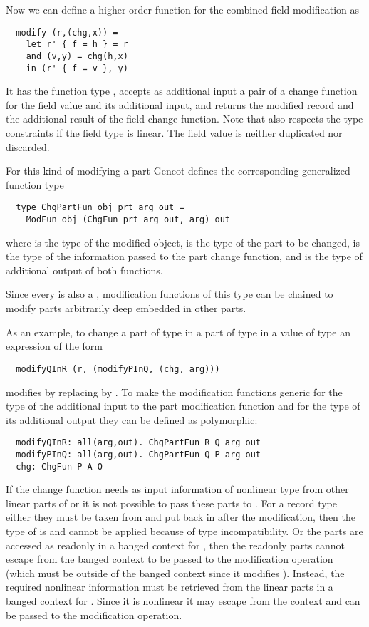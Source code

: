 Now we can define a higher order function for the combined field modification as
\begin{verbatim}
  modify (r,(chg,x)) = 
    let r' { f = h } = r
    and (v,y) = chg(h,x)
    in (r' { f = v }, y)
\end{verbatim}
It has the function type , accepts as additional input a pair of a change
function for the field value and its additional input, and returns the modified record and the additional result of
the field change function. Note that  also respects the type constraints if the field type 
is linear. The field value is neither duplicated nor discarded.

For this kind of modifying a part Gencot defines the corresponding generalized function type
\begin{verbatim}
  type ChgPartFun obj prt arg out = 
    ModFun obj (ChgFun prt arg out, arg) out
\end{verbatim}
where  is the type of the modified object,  is the type of the part to be changed,  is the type
of the information passed to the part change function, and  is the type of additional output of both functions.

Since every  is also a , modification functions of this type can be chained to modify parts arbitrarily 
deep embedded in other parts. 

As an example, to change a part  of type  in a part  of type  in a value  of type 
an expression of the form
\begin{verbatim}
  modifyQInR (r, (modifyPInQ, (chg, arg)))
\end{verbatim}
modifies  by replacing  by . To make the modification functions generic for the type of the additional input
to the part modification function and for the type of its additional output they can be defined as polymorphic:
\begin{verbatim}
  modifyQInR: all(arg,out). ChgPartFun R Q arg out
  modifyPInQ: all(arg,out). ChgPartFun Q P arg out
  chg: ChgFun P A O
\end{verbatim}

If the change function  needs as input information of nonlinear type from other linear parts of  or  it is not
possible to pass these parts to . For a record type  either they must be taken from  and put back in after the modification, then
the type of  is  and  cannot be applied because of type incompatibility. Or the parts are
accessed as readonly in a banged context for , then the readonly parts cannot escape from the banged context to be passed to the
modification operation (which must be outside of the banged context since it modifies ). Instead, the required nonlinear information must 
be retrieved from the linear parts in a banged context for . Since it is nonlinear it may escape from the context and can be passed 
to the modification operation.

